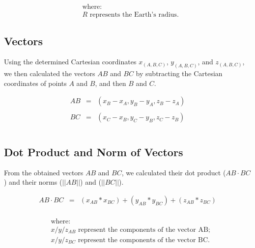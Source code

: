     \begin{align*}
    &\text{where:} \\
    &R \text{ represents the Earth's radius.}
    \end{align*}

\subsection{Vectors}
    \label{annexes:calcul-detours-angles-vecteurs}

Using the determined Cartesian coordinates \(x_{(A, B, C)}\), \(y_{(A, B, C)}\), and \(z_{(A, B, C)}\), we then calculated the vectors \(AB\) and \(BC\) by subtracting the Cartesian coordinates of points \(A\) and \(B\), and then \(B\) and \(C\).%

    \begin{equation*}
    \begin{array}{lclclclclcl}
    \displaystyle AB &=& (x_B - x_A, y_B - y_A, z_B - z_A)\\\\
    \displaystyle BC &=& (x_C - x_B, y_C - y_B, z_C - z_B)\\\\
    \end{array}
    \end{equation*}

\subsection{Dot Product and Norm of Vectors}
    \label{annexes:calcul-detours-angles-produit-scalaire}

From the obtained vectors \(AB\) and \(BC\), we calculated their dot product (\(AB \cdot BC\)) and their norms (\(||{AB}||\)) and (\(||{BC}||\)).%

    \begin{equation*}
    \begin{array}{lclclclclcl}
    \displaystyle AB \cdot BC &=& (x_{AB} * x_{BC}) + (y_{AB} * y_{BC}) + (z_{AB} * z_{BC})\\
    \end{array}
    \end{equation*}

    \begin{align*}
    &\text{where:} \\
    &x/y/z_{AB} \text{ represent the components of the vector AB;}\\
    &x/y/z_{BC} \text{ represent the components of the vector BC.}
    \end{align*}

